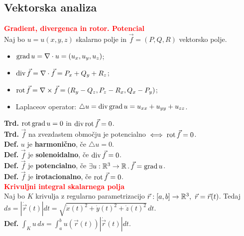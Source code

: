 \documentclass[a4paper,oneside,8pt,landscape]{extarticle}
\begin{document}
\begin{multicols*}{3}
\section{Vektorska analiza}
\textbf{\textcolor{red}{Gradient, divergenca in rotor. Potencial}}\\
Naj bo \(u = u(x, y, z)\) skalarno polje in \(\vec{f} = (P, Q, R)\) vektorsko polje.
\begin{itemize}
    \item \(\operatorname{grad} u = \nabla \cdot u = (u_x, u_y, u_z)\);
    \item \(\operatorname{div} \vec{f} = \nabla \cdot \vec{f} = P_x + Q_y + R_z\);
    \item \(\operatorname{rot} \vec{f} = \nabla \times \vec{f} = (R_y - Q_z, P_z - R_x, Q_x - P_y)\);
    \item Laplaceov operator: \(\triangle u = \operatorname{div} \operatorname{grad} u = u_{xx} + u_{yy} + u_{zz}\).
\end{itemize}
\textbf{Trd.} \(\operatorname{rot} \operatorname{grad} u = 0\) in \(\operatorname{div} \operatorname{rot} \vec{f} = 0\).\\
\textbf{Trd.} \(\vec{f}\) na zvezdastem območju je potencialno \(\iff \operatorname{rot} \vec{f} = 0\).\\
\textbf{Def.} \(u\) je \textbf{harmonično}, če \(\triangle u = 0\).\\
\textbf{Def.} \(\vec{f}\) je \textbf{solenoidalno}, če \(\operatorname{div} \vec{f} = 0\).\\
\textbf{Def.} \(\vec{f}\) je \textbf{potencialno}, če \(\exists u: \mathbb{R}^3 \to \mathbb{R} \,.\, \vec{f} = \operatorname{grad} u\).\\
\textbf{Def.} \(\vec{f}\) je \textbf{irotacionalno}, če \(\operatorname{rot} \vec{f} = 0\).\\
%
%
\textbf{\textcolor{red}{Krivuljni integral skalarnega polja}}\\
Naj bo \(K\) krivulja z regularno parametrizacijo \(\vec{r}: [a,b] \to \mathbb{R}^3,\ \vec{r} = \vec{r}(t)\). Tedaj \(ds = |\dot{\vec{r}}(t)| dt = \sqrt{\dot{x}(t)^2 + \dot{y}(t)^2 + \dot{z}(t)^2} \, dt\).\\
\textbf{Def.} \(\int_{K} u \, ds = \int_{a}^{b} u(\vec{r}(t)) |\dot{\vec{r}}(t)| dt\).\\
%
%
\


\end{multicols*}
\end{document}
